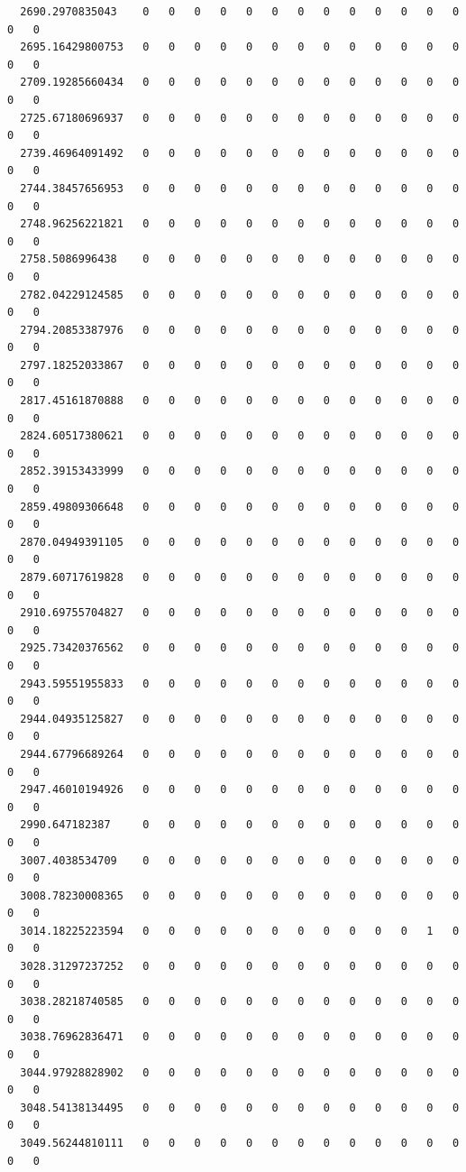 \documentclass[
  letterpaper,
  DIV=11,
  numbers=noendperiod]{scrartcl}
\begin{document}
\begin{verbatim}
  2690.2970835043    0   0   0   0   0   0   0   0   0   0   0   0   0   0   0
  2695.16429800753   0   0   0   0   0   0   0   0   0   0   0   0   0   0   0
  2709.19285660434   0   0   0   0   0   0   0   0   0   0   0   0   0   0   0
  2725.67180696937   0   0   0   0   0   0   0   0   0   0   0   0   0   0   0
  2739.46964091492   0   0   0   0   0   0   0   0   0   0   0   0   0   0   0
  2744.38457656953   0   0   0   0   0   0   0   0   0   0   0   0   0   0   0
  2748.96256221821   0   0   0   0   0   0   0   0   0   0   0   0   0   0   0
  2758.5086996438    0   0   0   0   0   0   0   0   0   0   0   0   0   0   0
  2782.04229124585   0   0   0   0   0   0   0   0   0   0   0   0   0   0   0
  2794.20853387976   0   0   0   0   0   0   0   0   0   0   0   0   0   0   0
  2797.18252033867   0   0   0   0   0   0   0   0   0   0   0   0   0   0   0
  2817.45161870888   0   0   0   0   0   0   0   0   0   0   0   0   0   0   0
  2824.60517380621   0   0   0   0   0   0   0   0   0   0   0   0   0   0   0
  2852.39153433999   0   0   0   0   0   0   0   0   0   0   0   0   0   0   0
  2859.49809306648   0   0   0   0   0   0   0   0   0   0   0   0   0   0   0
  2870.04949391105   0   0   0   0   0   0   0   0   0   0   0   0   0   0   0
  2879.60717619828   0   0   0   0   0   0   0   0   0   0   0   0   0   0   0
  2910.69755704827   0   0   0   0   0   0   0   0   0   0   0   0   0   0   0
  2925.73420376562   0   0   0   0   0   0   0   0   0   0   0   0   0   0   0
  2943.59551955833   0   0   0   0   0   0   0   0   0   0   0   0   0   0   0
  2944.04935125827   0   0   0   0   0   0   0   0   0   0   0   0   0   0   0
  2944.67796689264   0   0   0   0   0   0   0   0   0   0   0   0   0   0   0
  2947.46010194926   0   0   0   0   0   0   0   0   0   0   0   0   0   0   0
  2990.647182387     0   0   0   0   0   0   0   0   0   0   0   0   0   0   0
  3007.4038534709    0   0   0   0   0   0   0   0   0   0   0   0   0   0   0
  3008.78230008365   0   0   0   0   0   0   0   0   0   0   0   0   0   0   0
  3014.18225223594   0   0   0   0   0   0   0   0   0   0   0   1   0   0   0
  3028.31297237252   0   0   0   0   0   0   0   0   0   0   0   0   0   0   0
  3038.28218740585   0   0   0   0   0   0   0   0   0   0   0   0   0   0   0
  3038.76962836471   0   0   0   0   0   0   0   0   0   0   0   0   0   0   0
  3044.97928828902   0   0   0   0   0   0   0   0   0   0   0   0   0   0   0
  3048.54138134495   0   0   0   0   0   0   0   0   0   0   0   0   0   0   0
  3049.56244810111   0   0   0   0   0   0   0   0   0   0   0   0   0   0   0

\end{verbatim}
\end{document}
